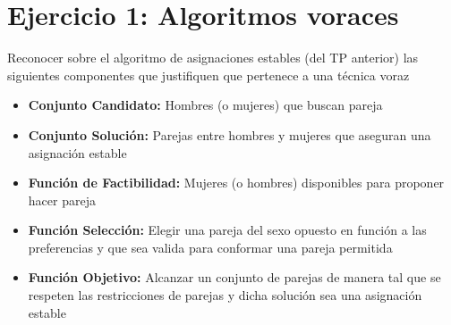 
\section{Ejercicio 1: Algoritmos voraces}
Reconocer sobre el algoritmo de asignaciones estables (del TP anterior) las siguientes componentes que justifiquen que pertenece a una técnica voraz
\begin{itemize}
  \item \textbf{Conjunto Candidato: }Hombres (o mujeres) que buscan pareja

  \item \textbf{Conjunto Solución: }Parejas entre hombres y mujeres que aseguran una asignación estable

  \item \textbf{Función de Factibilidad: }Mujeres (o hombres) disponibles para proponer hacer pareja

  \item \textbf{Función Selección: }Elegir una pareja del sexo opuesto en función a las preferencias y que sea valida para conformar una pareja permitida

  \item \textbf{Función Objetivo: }Alcanzar un conjunto de parejas de manera tal que se respeten las restricciones de parejas y dicha solución sea una asignación estable
\end{itemize}

